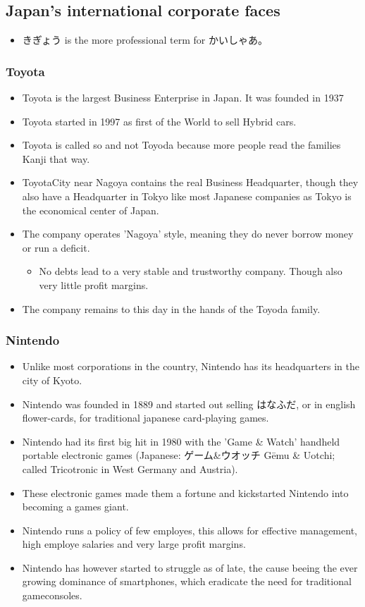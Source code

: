 \documentclass{article}
\newcommand\tabni[1][0.2cm]{\hspace*{#1}}
\begin{document}
\subsection{Japan's international corporate faces}
\begin{itemize}
\item きぎょう is the more professional term for かいしゃあ。
\end{itemize}
\subsubsection{ \tabni Toyota}
\begin{itemize}
\item Toyota is the largest Business Enterprise in Japan. It was founded in 1937
\item Toyota started in 1997 as first of the World to sell Hybrid cars.
\item Toyota is called so and not Toyoda because more people read the families Kanji that way.
\item ToyotaCity near Nagoya contains the real Business Headquarter, though they also have a Headquarter in Tokyo like most Japanese companies as Tokyo is the economical center of Japan.
\item The company operates 'Nagoya' style, meaning they do never borrow money or run a deficit.
\begin{itemize}
\item No debts lead to a very stable and trustworthy company. Though also very little profit margins.
\end{itemize}
\item The company remains to this day in the hands of the Toyoda family.
\end{itemize}
\subsubsection{ \tabni Nintendo}
\begin{itemize}
\item Unlike most corporations in the country, Nintendo has its headquarters in the city of Kyoto.
\item Nintendo was founded in 1889 and started out selling はなふだ, or in english flower-cards, for traditional japanese card-playing games.
\item Nintendo had its first big hit in 1980 with the 'Game \& Watch' handheld portable electronic games (Japanese: ゲーム\&ウオッチ Gēmu \& Uotchi; called Tricotronic in West Germany and Austria). 
\item These electronic games made them a fortune and kickstarted Nintendo into becoming a games giant.
\item Nintendo runs a policy of few employes, this allows for effective management, high employe salaries and very large profit margins.
\item Nintendo has however started to struggle as of late, the cause beeing the ever growing dominance of smartphones, which eradicate the need for traditional gameconsoles.
\end{itemize}
\end{document}
